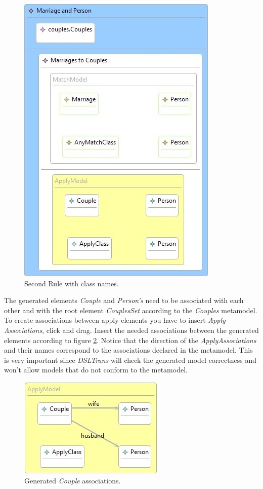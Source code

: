 \begin{figure}[h]
\begin{center}
  \includegraphics[scale=0.7]{imgs/second_rule_skeleton_2.jpg}
  \caption{Second Rule with class names.}
  \label{fig:second_rule_skeleton_2}
\end{center}
\end{figure}

The generated elements \emph{Couple} and \emph{Person's} need to be associated
with each other and with the root element \emph{CouplesSet} according to the
\emph{Couples} metamodel. To create associations between apply elements you have
to insert \emph{Apply Associations}, click and drag. Insert the needed
associations between the generated elements according to figure
\ref{fig:couple_relations}. Notice that the direction of the
\emph{ApplyAssociations} and their names correspond to the associations
declared in the metamodel. This is very important since \emph{DSLTrans} will
check the generated model correctness and won't allow models that do not conform to
the metamodel.

\begin{figure}[h]
\begin{center}
  \includegraphics[scale=0.7]{imgs/couple_relations.jpg}
  \caption{Generated \emph{Couple} associations.}
  \label{fig:couple_relations}
\end{center}
\end{figure}

